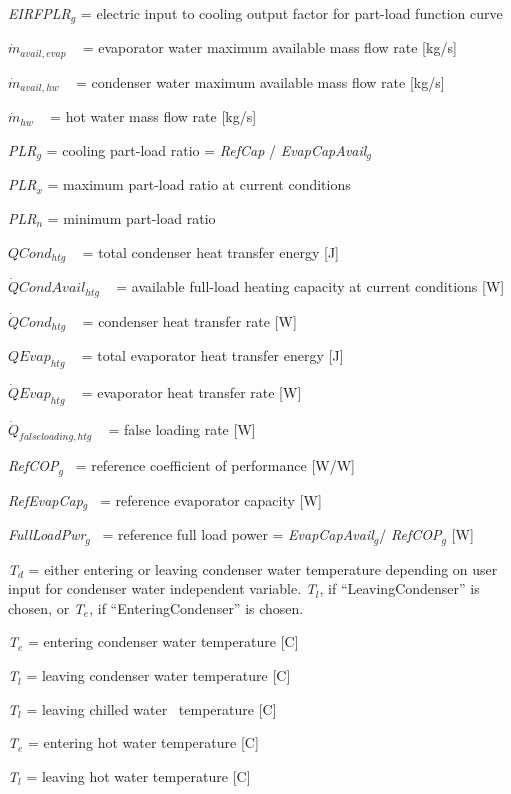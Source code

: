 \emph{EIRFPLR\(_{g}\)} = electric input to cooling output factor for part-load function curve

\({\dot m_{avail,evap}}\) ~ = evaporator water maximum available mass flow rate {[}kg/s{]}

\({\dot m_{avail,hw}}\) ~ = condenser water maximum available mass flow rate {[}kg/s{]}

\({\dot m_{hw}}\) ~ = hot water mass flow rate {[}kg/s{]}

\emph{PLR\(_{g}\)} = cooling part-load ratio = \emph{RefCap} / \emph{EvapCapAvail\(_{g}\)}

\emph{PLR\(_{x}\)} = maximum part-load ratio at current conditions

\emph{PLR\(_{n}\)} = minimum part-load ratio

\(QCon{d_{htg}}\) ~ = total condenser heat transfer energy {[}J{]}

\(\dot QCondAvai{l_{htg}}\) ~ = available full-load heating capacity at current conditions {[}W{]}

\(\dot QCon{d_{htg}}\) ~ = condenser heat transfer rate {[}W{]}

\(QEva{p_{htg}}\) ~ = total evaporator heat transfer energy {[}J{]}

\(\dot QEva{p_{htg}}\) ~ = evaporator heat transfer rate {[}W{]}

\({\dot Q_{falseloading,htg}}\) ~ = false loading rate {[}W{]}

\emph{RefCOP\(_{g}\)}~ = reference coefficient of performance {[}W/W{]}

\emph{RefEvapCap\(_{g}\)}~ = reference evaporator capacity {[}W{]}

\emph{FullLoadPwr\(_{g}\)}~ = reference full load power = \emph{EvapCapAvail\(_{g}\)}/ \emph{RefCOP\(_{g}\)} {[}W{]}

\emph{T\(_{d}\)} = either entering or leaving condenser water temperature depending on user input for condenser water independent variable. \emph{T\(_{l}\)}, if ``LeavingCondenser'' is chosen, or \emph{T\(_{e}\)}, if ``EnteringCondenser'' is chosen.

\emph{T\(_{e}\)} = entering condenser water temperature {[}C{]}

\emph{T\(_{l}\)} = leaving condenser water temperature {[}C{]}

\emph{T\(_{l}\)} = leaving chilled water~ temperature {[}C{]}

\emph{T\(_{e}\)} = entering hot water temperature {[}C{]}

\emph{T\(_{l}\)} = leaving hot water temperature {[}C{]}

